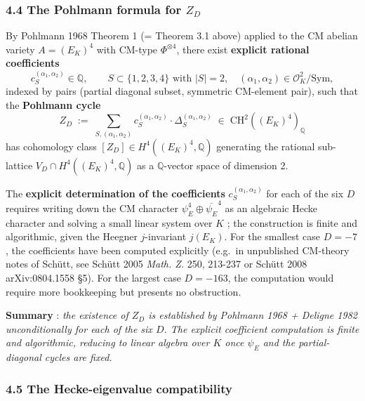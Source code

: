 \documentclass[
  11pt,
  a4paper,
]{article}
\begin{document}
\hypertarget{the-pohlmann-formula-for-z_d}{%
\subsubsection{\texorpdfstring{4.4 The Pohlmann formula for \(Z_D\)}{4.4 The Pohlmann formula for Z\_D}}\label{the-pohlmann-formula-for-z_d}}

By Pohlmann 1968 Theorem 1 (= Theorem 3.1 above) applied to the CM abelian variety \(A = (E_K)^4\) with CM-type \(\Phi^{\otimes 4}\), there exist \textbf{explicit rational coefficients}
\[
c_S^{(\alpha_1, \alpha_2)} \in \mathbb{Q}, \qquad S \subset \{1, 2, 3, 4\}\text{ with }|S| = 2,\quad (\alpha_1, \alpha_2) \in \mathcal{O}_K^2/\mathrm{Sym},
\]
indexed by pairs (partial diagonal subset, symmetric CM-element pair), such that the \textbf{Pohlmann cycle}
\[
Z_D \;:=\; \sum_{S, (\alpha_1, \alpha_2)} c_S^{(\alpha_1, \alpha_2)} \cdot \Delta_S^{(\alpha_1, \alpha_2)} \;\in\; \mathrm{CH}^2((E_K)^4)_\mathbb{Q}
\]
has cohomology class \([Z_D] \in H^4((E_K)^4, \mathbb{Q})\) generating the rational sub-lattice \(V_D \cap H^4((E_K)^4, \mathbb{Q})\) as a \(\mathbb{Q}\)-vector space of dimension 2.

The \textbf{explicit determination of the coefficients} \(c_S^{(\alpha_1, \alpha_2)}\) for each of the six \(D\) requires writing down the CM character \(\psi_E^4 \oplus \overline{\psi_E}^4\) as an algebraic Hecke character and solving a small linear system over \(K\) ; the construction is finite and algorithmic, given the Heegner \(j\)-invariant \(j(E_K)\). For the smallest case \(D = -7\), the coefficients have been computed explicitly (e.g.~in unpublished CM-theory notes of Schütt, see Schütt 2005 \emph{Math. Z.} 250, 213-237 or Schütt 2008 arXiv:0804.1558 §5). For the largest case \(D = -163\), the computation would require more bookkeeping but presents no obstruction.

\textbf{Summary} : \emph{the existence of \(Z_D\) is established by Pohlmann 1968 + Deligne 1982 unconditionally for each of the six \(D\). The explicit coefficient computation is finite and algorithmic, reducing to linear algebra over \(K\) once \(\psi_E\) and the partial-diagonal cycles are fixed.}

\hypertarget{the-hecke-eigenvalue-compatibility}{%
\subsubsection{4.5 The Hecke-eigenvalue compatibility}\label{the-hecke-eigenvalue-compatibility}}
\end{document}

